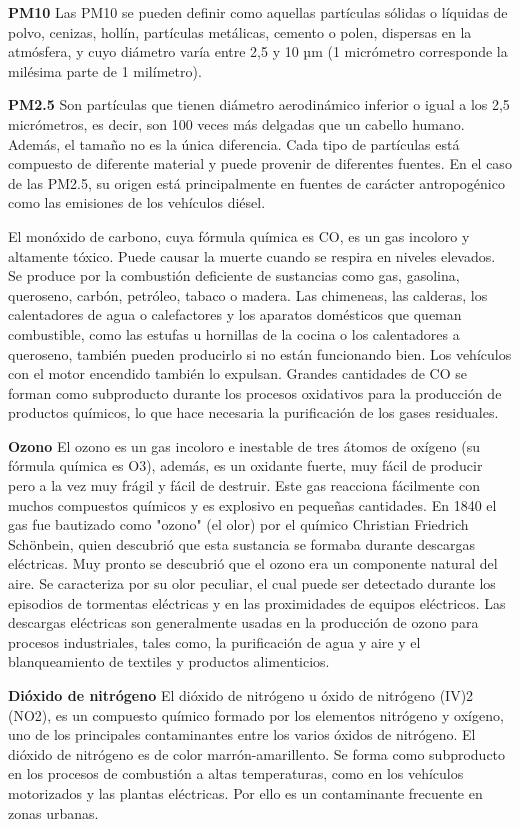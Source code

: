 \textbf{PM10} 
Las PM10 se pueden definir como aquellas partículas sólidas o líquidas de polvo, cenizas, hollín, partículas metálicas, cemento o polen, dispersas en la atmósfera, y cuyo diámetro varía entre 2,5 y 10 µm (1 micrómetro corresponde la milésima parte de 1 milímetro).

\textbf{PM2.5} 
Son partículas que tienen diámetro aerodinámico inferior o igual a los 2,5 micrómetros, es decir, son 100 veces más delgadas que un cabello humano.
Además, el tamaño no es la única diferencia. Cada tipo de partículas está compuesto de diferente material y puede provenir de diferentes fuentes. En el caso de las PM2.5, su origen está principalmente en fuentes de carácter antropogénico como las emisiones de los vehículos diésel.


El monóxido de carbono, cuya fórmula química es CO, es un gas incoloro y altamente tóxico. Puede causar la muerte cuando se respira en niveles elevados. Se produce por la combustión deficiente de sustancias como gas, gasolina, queroseno, carbón, petróleo, tabaco o madera. Las chimeneas, las calderas, los calentadores de agua o calefactores y los aparatos domésticos que queman combustible, como las estufas u hornillas de la cocina o los calentadores a queroseno, también pueden producirlo si no están funcionando bien. Los vehículos con el motor encendido también lo expulsan. Grandes cantidades de CO se forman como subproducto durante los procesos oxidativos para la producción de productos químicos, lo que hace necesaria la purificación de los gases residuales. 

\textbf{Ozono}
El ozono es un gas incoloro e inestable de tres átomos de oxígeno (su fórmula química es O3), además, es un oxidante fuerte, muy fácil de producir pero a la vez muy frágil y fácil de destruir. Este gas reacciona fácilmente con muchos compuestos químicos y es explosivo en pequeñas cantidades. En 1840 el gas fue bautizado como "ozono" (el olor) por el químico Christian Friedrich Schönbein, quien descubrió que esta sustancia se formaba durante descargas eléctricas. Muy pronto se descubrió que el ozono era un componente natural del aire. Se caracteriza por su olor peculiar, el cual puede ser detectado durante los episodios de tormentas eléctricas y en las proximidades de equipos eléctricos. Las descargas eléctricas son generalmente usadas en la producción de ozono para procesos industriales, tales como, la purificación de agua y aire y el blanqueamiento de textiles y productos alimenticios.

\textbf{Dióxido de nitrógeno}
El dióxido de nitrógeno u óxido de nitrógeno (IV)2 (NO2), es un compuesto químico formado por los elementos nitrógeno y oxígeno, uno de los principales contaminantes entre los varios óxidos de nitrógeno.
El dióxido de nitrógeno es de color marrón-amarillento. Se forma como subproducto en los procesos de combustión a altas temperaturas, como en los vehículos motorizados y las plantas eléctricas. Por ello es un contaminante frecuente en zonas urbanas.


